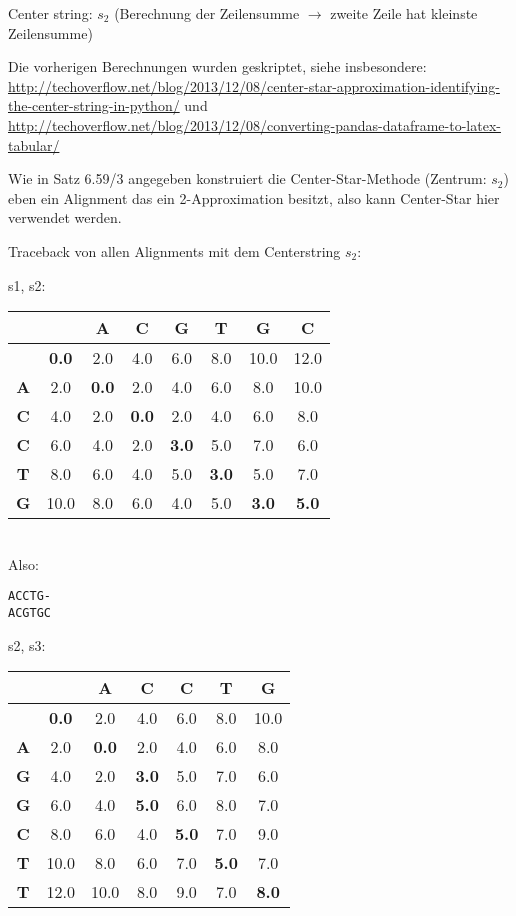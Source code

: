 \documentclass[a4paper,10pt,oneside,leqno]{scrartcl}
\begin{document}
Center string: $s_2$ (Berechnung der Zeilensumme $\rightarrow$ zweite Zeile hat kleinste Zeilensumme)

Die vorherigen Berechnungen wurden geskriptet, siehe insbesondere:\\
\url{http://techoverflow.net/blog/2013/12/08/center-star-approximation-identifying-the-center-string-in-python/} und\\
\url{http://techoverflow.net/blog/2013/12/08/converting-pandas-dataframe-to-latex-tabular/}

Wie in Satz 6.59/3 angegeben konstruiert die Center-Star-Methode (Zentrum: $s_2$) eben ein Alignment das ein 2-Approximation besitzt, also kann Center-Star hier verwendet werden.

Traceback von allen Alignments mit dem Centerstring $s_2$:

s1, s2: \\
\begin{tabular}{c|ccccccc}
& \textbf{ } & \textbf{A} & \textbf{C} & \textbf{G} & \textbf{T} & \textbf{G} & \textbf{C}\\\hline
\textbf{ } & \textbf{0.0} & 2.0 & 4.0 & 6.0 & 8.0 & 10.0 & 12.0\\
\textbf{A} & 2.0 & \textbf{0.0} & 2.0 & 4.0 & 6.0 & 8.0 & 10.0\\
\textbf{C} & 4.0 & 2.0 & \textbf{0.0} & 2.0 & 4.0 & 6.0 & 8.0\\
\textbf{C} & 6.0 & 4.0 & 2.0 & \textbf{3.0} & 5.0 & 7.0 & 6.0\\
\textbf{T} & 8.0 & 6.0 & 4.0 & 5.0 & \textbf{3.0} & 5.0 & 7.0\\
\textbf{G} & 10.0 & 8.0 & 6.0 & 4.0 & 5.0 & \textbf{3.0} & \textbf{5.0}\\
\end{tabular}\\
Also:
\begin{verbatim}
ACCTG-
ACGTGC
\end{verbatim}

s2, s3: \\
\begin{tabular}{c|cccccc}
& \textbf{ } & \textbf{A} & \textbf{C} & \textbf{C} & \textbf{T} & \textbf{G}\\\hline
\textbf{ } & \textbf{0.0} & 2.0 & 4.0 & 6.0 & 8.0 & 10.0\\
\textbf{A} & 2.0 & \textbf{0.0} & 2.0 & 4.0 & 6.0 & 8.0\\
\textbf{G} & 4.0 & 2.0 & \textbf{3.0} & 5.0 & 7.0 & 6.0\\
\textbf{G} & 6.0 & 4.0 & \textbf{5.0} & 6.0 & 8.0 & 7.0\\
\textbf{C} & 8.0 & 6.0 & 4.0 & \textbf{5.0} & 7.0 & 9.0\\
\textbf{T} & 10.0 & 8.0 & 6.0 & 7.0 & \textbf{5.0} & 7.0\\
\textbf{T} & 12.0 & 10.0 & 8.0 & 9.0 & 7.0 & \textbf{8.0}\\
\end{tabular}
\end{document}
